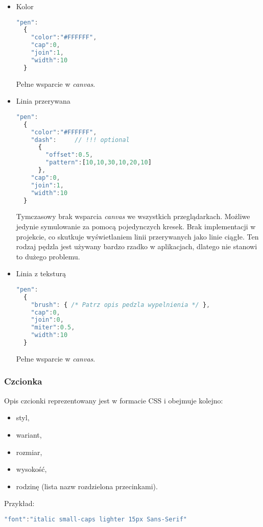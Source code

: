 \begin{itemize}
\item Kolor
\begin{lstlisting}[language=JavaScript,numbers=none]
"pen":
  {
    "color":"#FFFFFF",
    "cap":0,
    "join":1,
    "width":10
  }
\end{lstlisting}
Pełne wsparcie w \emph{canvas}.

\item Linia przerywana
\begin{lstlisting}[language=JavaScript,numbers=none]
"pen":
  {
    "color":"#FFFFFF",
    "dash":		// !!! optional
      {
        "offset":0.5,
        "pattern":[10,10,30,10,20,10]
      },
    "cap":0,
    "join":1,
    "width":10
  }
\end{lstlisting}
Tymczasowy brak wsparcia \emph{canvas} we wszystkich przeglądarkach. Możliwe jedynie symulowanie za pomocą pojedynczych kresek. Brak implementacji w projekcie, co skutkuje wyświetlaniem linii przerywanych jako linie ciągłe. Ten rodzaj pędzla jest używany bardzo rzadko w aplikacjach, dlatego nie stanowi to dużego problemu.


\item Linia z teksturą
\begin{lstlisting}[language=JavaScript,numbers=none]
"pen":
  {
    "brush": { /* Patrz opis pedzla wypelnienia */ },
    "cap":0,
    "join":0,
    "miter":0.5,
    "width":10
  }
\end{lstlisting}
Pełne wsparcie w \emph{canvas}.

\end{itemize}

\subsubsection{Czcionka}
Opis czcionki reprezentowany jest w formacie CSS \cite{cssfont} i obejmuje kolejno:
\begin{itemize}
\item styl,
\item wariant,
\item rozmiar,
\item wysokość,
\item rodzinę (lista nazw rozdzielona przecinkami).
\end{itemize}

Przykład:
\begin{lstlisting}[language=JavaScript,numbers=none]
"font":"italic small-caps lighter 15px Sans-Serif"
\end{lstlisting}

